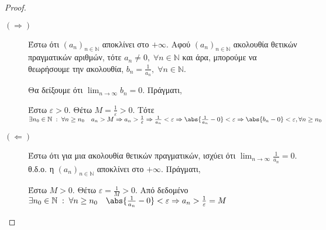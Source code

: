 \documentclass[main.tex]{subfiles}
\begin{document}
\begin{proof}
\item {}
    \begin{description}
        \item[$ (\Rightarrow) $] Έστω ότι $ (a_{n})_{n \in \mathbb{N}} $ 
            αποκλίνει στο $ + \infty $. Αφού $ (a_{n})_{n \in \mathbb{N}} $
            ακολουθία θετικών πραγματικών αριθμών, τότε $ a_{n} \neq 0, 
            \; \forall n \in \mathbb{N}$ και άρα, μπορούμε να θεωρήσουμε 
            την ακολουθία, $ b_{n} = \frac{1}{a_{n}}, \; \forall n \in
            \mathbb{N}  $. 

            Θα δείξουμε ότι $ \lim_{n \to \infty} b_{n} = 0 $. Πράγματι,

            Έστω $ \varepsilon >0 $. Θέτω $ M = \frac{1}{\varepsilon} >0 $.
            Τότε $ \exists n_{0} \in \mathbb{N} \; : \; \forall n \geq 
            n_{0} \quad a_{n}> M \Rightarrow a_{n} > \frac{1}{\varepsilon} 
            \Rightarrow \frac{1}{a_{n}} < \varepsilon \Rightarrow
            \abs{\frac{1}{a_{n}} - 0} < \varepsilon \Rightarrow 
            \abs{b_{n}-0} < \varepsilon, \forall n \geq n_{0} $

        \item [$ ( \Leftarrow) $]
            Έστω ότι για μια ακολουθία θετικών πραγματικών, ισχύει ότι 
            $ \lim_{n \to \infty} \frac{1}{a_{n}} = 0$. θ.δ.ο. η $ 
            (a_{n})_{n \in \mathbb{N}}$ αποκλίνει στο $ + \infty $. Πράγματι,

            Έστω $ M > 0 $. Θέτω $ \varepsilon = \frac{1}{M} > 0 $. Από 
            δεδομένο $ \exists n_{0} \in \mathbb{N} \; : \; \forall n \geq 
            n_{0} \quad \abs{\frac{1}{a_{n}} - 0} < \varepsilon \Rightarrow
            a_{n} > \frac{1}{\varepsilon}=M $
    \end{description}
\end{proof}

\end{document}
